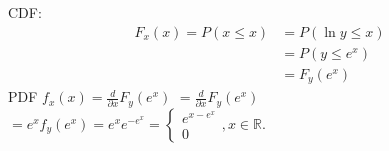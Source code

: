 CDF:
$$
\begin{aligned}
F_x(x)=P(x \leq x) &=P(\ln y \leq x) \\
&=P\left(y \leq e^x\right) \\
&=F_y\left(e^x\right)
\end{aligned}
$$
PDF
$f_x(x)=\frac{d}{\partial x} F_y\left(e^x\right)$
$=\frac{d}{\partial x} F_y\left(e^x\right)$
$=e^x f_y\left(e^x\right)=e^x e^{-e^x}=\left\{\begin{array}{l}e^{x-e^x} \\ 0\end{array}, x \in \mathbb{R}\right.$.